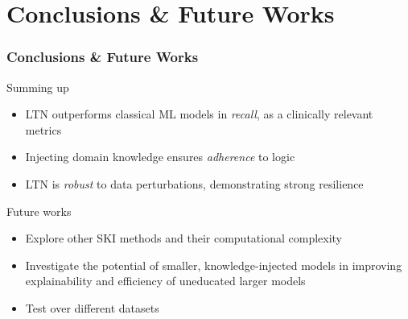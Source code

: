 \documentclass[presentation]{beamer} %
\begin{document}
{%
}
\section[Discussion]{Conclusions \& Future Works}
{
 \usebackgroundtemplate{}

\begin{frame}
\frametitle{Conclusions \& Future Works}

\begin{block}{Summing up}
\begin{itemize}
\item LTN outperforms classical ML models in \emph{recall}, as a clinically relevant metrics
\item Injecting domain knowledge ensures \emph{adherence} to logic
\item LTN is \emph{robust} to data perturbations, demonstrating strong resilience
\end{itemize}
\end{block}

\begin{exampleblock}{Future works}
\begin{itemize}
\item Explore other SKI  methods and their computational complexity
\item Investigate the potential of smaller, knowledge-injected models in improving explainability and efficiency of uneducated larger models
\item Test over different datasets
\end{itemize}
\end{exampleblock}

\end{frame}



}
\end{document}
